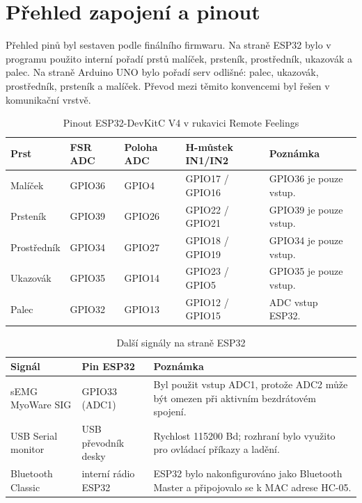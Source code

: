 \section{Přehled zapojení a pinout}
\label{sec:pinout}

Přehled pinů byl sestaven podle finálního firmwaru. Na straně ESP32 bylo v programu použito interní pořadí prstů malíček, prsteník, prostředník, ukazovák a palec. Na straně Arduino UNO bylo pořadí serv odlišné: palec, ukazovák, prostředník, prsteník a malíček. Převod mezi těmito konvencemi byl řešen v komunikační vrstvě.

\begin{table}[htbp]
\centering
\caption{Pinout ESP32-DevKitC V4 v rukavici Remote Feelings}
\label{tab:pinout-esp32}
\begin{tabular}{|p{}|p{}|p{}|p{}|p{}|}
\hline
\textbf{Prst} & \textbf{FSR ADC} & \textbf{Poloha ADC} & \textbf{H-můstek IN1/IN2} & \textbf{Poznámka} \\
\hline
Malíček & GPIO36 & GPIO4 & GPIO17 / GPIO16 & GPIO36 je pouze vstup. \\
\hline
Prsteník & GPIO39 & GPIO26 & GPIO22 / GPIO21 & GPIO39 je pouze vstup. \\
\hline
Prostředník & GPIO34 & GPIO27 & GPIO18 / GPIO19 & GPIO34 je pouze vstup. \\
\hline
Ukazovák & GPIO35 & GPIO14 & GPIO23 / GPIO5 & GPIO35 je pouze vstup. \\
\hline
Palec & GPIO32 & GPIO13 & GPIO12 / GPIO15 & ADC vstup ESP32. \\
\hline
\end{tabular}
\end{table}

\begin{table}[htbp]
\centering
\caption{Další signály na straně ESP32}
\label{tab:pinout-esp32-dalsi}
\begin{tabular}{|p{}|p{}|p{}|}
\hline
\textbf{Signál} & \textbf{Pin ESP32} & \textbf{Poznámka} \\
\hline
sEMG MyoWare SIG & GPIO33 (ADC1) & Byl použit vstup ADC1, protože ADC2 může být omezen při aktivním bezdrátovém spojení. \\
\hline
USB Serial monitor & USB převodník desky & Rychlost 115200 Bd; rozhraní bylo využito pro ovládací příkazy a ladění. \\
\hline
Bluetooth Classic & interní rádio ESP32 & ESP32 bylo nakonfigurováno jako Bluetooth Master a připojovalo se k MAC adrese HC-05. \\
\hline
\end{tabular}
\end{table}


